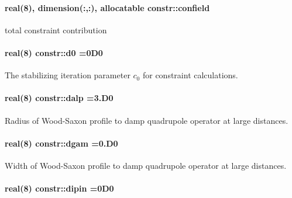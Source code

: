 \paragraph[{\texorpdfstring{confield}{confield}}]{\setlength{\rightskip}{0pt plus 5cm}real(8), dimension(\+:,\+:), allocatable constr\+::confield}\hypertarget{namespaceconstr_a862fa5ac4551dc4c5c5bdd92e86b533c}{}\label{namespaceconstr_a862fa5ac4551dc4c5c5bdd92e86b533c}


total constraint contribution 

\paragraph[{\texorpdfstring{d0}{d0}}]{\setlength{\rightskip}{0pt plus 5cm}real(8) constr\+::d0 =0\+D0}\hypertarget{namespaceconstr_a604072f42d782b0664f52b3c06da75f3}{}\label{namespaceconstr_a604072f42d782b0664f52b3c06da75f3}


The stabilizing iteration parameter $ c_0 $ for constraint calculations. 

\paragraph[{\texorpdfstring{dalp}{dalp}}]{\setlength{\rightskip}{0pt plus 5cm}real(8) constr\+::dalp =3.\+D0}\hypertarget{namespaceconstr_a059179482b95154c05c0476d1fd80dda}{}\label{namespaceconstr_a059179482b95154c05c0476d1fd80dda}


Radius of Wood-\/\+Saxon profile to damp quadrupole operator at large distances. 

\paragraph[{\texorpdfstring{dgam}{dgam}}]{\setlength{\rightskip}{0pt plus 5cm}real(8) constr\+::dgam =0.\+D0}\hypertarget{namespaceconstr_a2ba7200830052d0e14c259604eb096be}{}\label{namespaceconstr_a2ba7200830052d0e14c259604eb096be}


Width of Wood-\/\+Saxon profile to damp quadrupole operator at large distances. 

\paragraph[{\texorpdfstring{dipin}{dipin}}]{\setlength{\rightskip}{0pt plus 5cm}real(8) constr\+::dipin =0\+D0}\hypertarget{namespaceconstr_a887fcb22bdc9514af569e050617e5520}{}\label{namespaceconstr_a887fcb22bdc9514af569e050617e5520}



